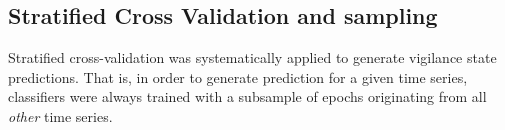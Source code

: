 \subsection{Stratified Cross Validation and sampling}



Stratified cross-validation was systematically applied to generate vigilance state predictions.
That is, in order to generate prediction for a given time series, classifiers were always trained with a subsample of epochs
originating from all \emph{other} time series.

